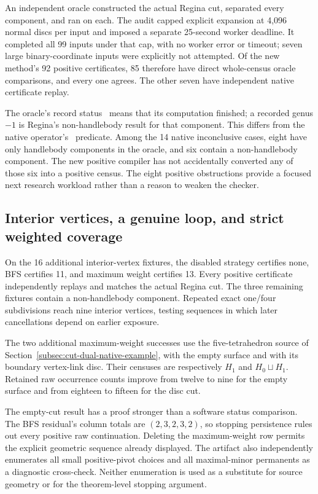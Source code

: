 An independent oracle constructed the actual Regina cut, separated every
component, and ran  on each. The audit capped
explicit expansion at 4,096 normal discs per input and imposed a separate
25-second worker deadline. It completed all 99 inputs under that cap, with
no worker error or timeout; seven large binary-coordinate inputs were
explicitly not attempted. Of the new method's 92 positive certificates,
85 therefore have direct whole-census oracle comparisons, and every one
agrees. The other seven have independent native certificate replay.

The oracle's record status \Complete\ means that its computation finished;
a recorded genus $-1$ is Regina's non-handlebody result for that component.
This differs from the native operator's \Complete\ predicate. Among the
14 native inconclusive cases, eight have only handlebody components in
the oracle, and six contain a non-handlebody component. The new positive
compiler has not accidentally converted any of those six into a positive
census. The eight positive obstructions provide a focused next research
workload rather than a reason to weaken the checker.

\subsection{Interior vertices, a genuine loop, and strict weighted coverage}

On the 16 additional interior-vertex fixtures, the disabled strategy
certifies none, BFS certifies 11, and maximum weight certifies 13.
Every positive certificate independently replays and matches the actual
Regina cut. The three remaining fixtures contain a non-handlebody component.
Repeated exact one/four subdivisions reach nine interior vertices, testing
sequences in which later cancellations depend on earlier exposure.

The two additional maximum-weight successes use the five-tetrahedron source
of Section~\ref{subsec:cut-dual-native-example}, with the empty surface and
with its boundary vertex-link disc. Their censuses are respectively $H_1$
and $H_0\sqcup H_1$. Retained raw occurrence counts improve from twelve to
nine for the empty surface and from eighteen to fifteen for the disc cut.

The empty-cut result has a proof stronger than a software status comparison.
The BFS residual's column totals are $(2,3,2,3,2)$, so stopping persistence
rules out every positive raw continuation. Deleting the maximum-weight
row permits the explicit geometric sequence already displayed. The
artifact also independently enumerates all small positive-pivot choices
and all maximal-minor permanents as a diagnostic cross-check. Neither
enumeration is used as a substitute for source geometry or for the
theorem-level stopping argument.

